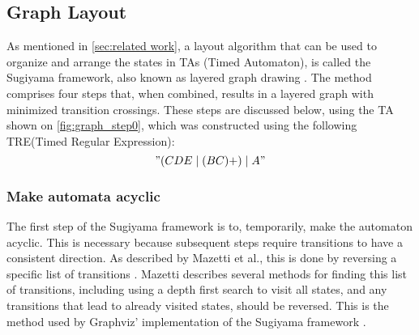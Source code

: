 \subsection{Graph Layout}\label{subsec:graphlayout}





As mentioned in \cref{sec:related work}, a layout algorithm that can be used to organize and arrange the states in TAs (Timed Automaton), is called the Sugiyama framework, also known as layered graph drawing \cite{Sugiyama1981}. The method comprises four steps that, when combined, results in a layered graph with minimized transition crossings. These steps are discussed below, using the TA shown on \cref{fig:graph_step0}, which was constructed using the following TRE(Timed Regular Expression): $$"(CDE\mid(BC)+)\mid A"$$

\begin{center}
    
\end{center}

\subsubsection{Make automata acyclic}
The first step of the Sugiyama framework is to, temporarily, make the automaton acyclic. This is necessary because subsequent steps require transitions to have a consistent direction. As described by Mazetti et al., this is done by reversing a specific list of transitions \cite{Mazetti2012}.
Mazetti describes several methods for finding this list of transitions, including using a depth first search to visit all states, and any transitions that lead to already visited states, should be reversed.
This is the method used by Graphviz' implementation of the Sugiyama framework \cite{Graphviz}. %

